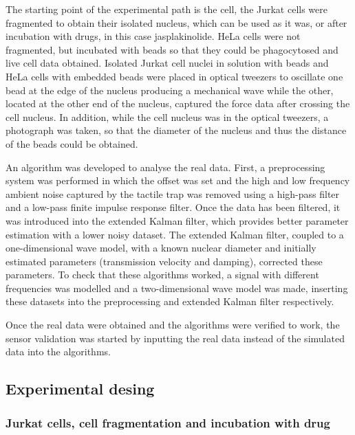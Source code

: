 \documentclass[12pt, a4paper]{article} %
\begin{document}
The starting point of the experimental path is the cell, the Jurkat cells were fragmented to obtain their isolated nucleus, which can be used as it was, or after incubation with drugs, in this case jasplakinolide. HeLa cells were not fragmented, but incubated with beads so that they could be phagocytosed and live cell data obtained. Isolated Jurkat cell nuclei in solution with beads and HeLa cells with embedded beads were placed in optical tweezers to oscillate one bead at the edge of the nucleus producing a mechanical wave while the other, located at the other end of the nucleus, captured the force data after crossing the cell nucleus. In addition, while the cell nucleus was in the optical tweezers, a photograph was taken, so that the diameter of the nucleus and thus the distance of the beads could be obtained.

An algorithm was developed to analyse the real data. First, a preprocessing system was performed in which the offset was set and the high and low frequency ambient noise captured by the tactile trap was removed using a high-pass filter and a low-pass finite impulse response filter. Once the data has been filtered, it was introduced into the extended Kalman filter, which provides better parameter estimation with a lower noisy dataset. The extended Kalman filter, coupled to a one-dimensional wave model, with a known nuclear diameter and initially estimated parameters (transmission velocity and damping), corrected these parameters. To check that these algorithms worked, a signal with different frequencies was modelled and a two-dimensional wave model was made, inserting these datasets into the preprocessing and extended Kalman filter respectively.

Once the real data were obtained and the algorithms were verified to work, the sensor validation was started by inputting the real data instead of the simulated data into the algorithms. 

\setlength{\parskip}{0mm}

\subsection{Experimental desing}

\subsubsection{Jurkat cells, cell fragmentation and incubation with drug}
\end{document}
